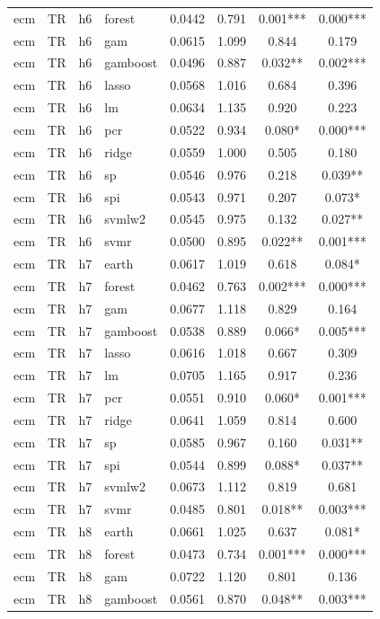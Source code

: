 \begin{ThreePartTable}
\begin{longtable}[t]{llclcccc}
ecm & TR & h6 & forest & 0.0442 & 0.791 & 0.001*** & 0.000***\\
ecm & TR & h6 & gam & 0.0615 & 1.099 & 0.844 & 0.179\\
ecm & TR & h6 & gamboost & 0.0496 & 0.887 & 0.032** & 0.002***\\
ecm & TR & h6 & lasso & 0.0568 & 1.016 & 0.684 & 0.396\\
ecm & TR & h6 & lm & 0.0634 & 1.135 & 0.920 & 0.223\\
ecm & TR & h6 & pcr & 0.0522 & 0.934 & 0.080* & 0.000***\\
ecm & TR & h6 & ridge & 0.0559 & 1.000 & 0.505 & 0.180\\
ecm & TR & h6 & sp & 0.0546 & 0.976 & 0.218 & 0.039**\\
ecm & TR & h6 & spi & 0.0543 & 0.971 & 0.207 & 0.073*\\
ecm & TR & h6 & svmlw2 & 0.0545 & 0.975 & 0.132 & 0.027**\\
ecm & TR & h6 & svmr & 0.0500 & 0.895 & 0.022** & 0.001***\\
\addlinespace
ecm & TR & h7 & earth & 0.0617 & 1.019 & 0.618 & 0.084*\\
ecm & TR & h7 & forest & 0.0462 & 0.763 & 0.002*** & 0.000***\\
ecm & TR & h7 & gam & 0.0677 & 1.118 & 0.829 & 0.164\\
ecm & TR & h7 & gamboost & 0.0538 & 0.889 & 0.066* & 0.005***\\
ecm & TR & h7 & lasso & 0.0616 & 1.018 & 0.667 & 0.309\\
ecm & TR & h7 & lm & 0.0705 & 1.165 & 0.917 & 0.236\\
ecm & TR & h7 & pcr & 0.0551 & 0.910 & 0.060* & 0.001***\\
ecm & TR & h7 & ridge & 0.0641 & 1.059 & 0.814 & 0.600\\
ecm & TR & h7 & sp & 0.0585 & 0.967 & 0.160 & 0.031**\\
ecm & TR & h7 & spi & 0.0544 & 0.899 & 0.088* & 0.037**\\
ecm & TR & h7 & svmlw2 & 0.0673 & 1.112 & 0.819 & 0.681\\
ecm & TR & h7 & svmr & 0.0485 & 0.801 & 0.018** & 0.003***\\
\addlinespace
ecm & TR & h8 & earth & 0.0661 & 1.025 & 0.637 & 0.081*\\
ecm & TR & h8 & forest & 0.0473 & 0.734 & 0.001*** & 0.000***\\
ecm & TR & h8 & gam & 0.0722 & 1.120 & 0.801 & 0.136\\
ecm & TR & h8 & gamboost & 0.0561 & 0.870 & 0.048** & 0.003***\\

\end{longtable}
\end{ThreePartTable}
